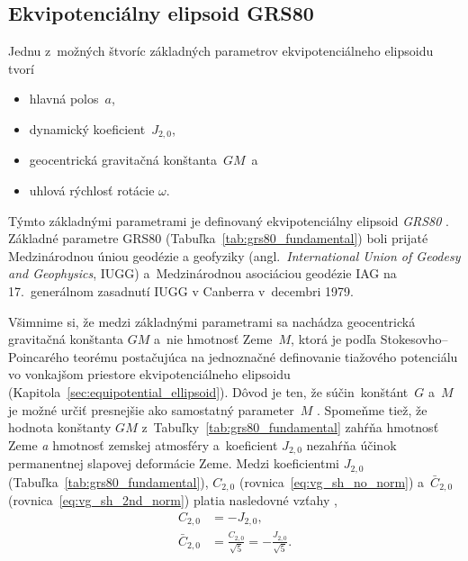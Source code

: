 \documentclass[a4paper, 12pt]{book}
\begin{document}
\subsection{Ekvipotenciálny elipsoid GRS80}
\label{sec:grs80}

Jednu z~možných štvoríc základných parametrov ekvipotenciálneho elipsoidu tvorí
%
\begin{itemize}
\item hlavná polos~$a$,
%
\item dynamický koeficient~$J_{2,0}$,
%
\item geocentrická gravitačná konštanta~$GM$~a
%
\item uhlová rýchlosť rotácie $\omega$.
\end{itemize}
%
Týmto základnými parametrami je definovaný ekvipotenciálny elipsoid 
\emph{GRS80} \parencite[angl. \textit{Geodetic Reference 
System~1980};][]{GRS80}.  Základné parametre GRS80 
(Tabuľka~\ref{tab:grs80_fundamental}) boli prijaté Medzinárodnou úniou geodézie 
a geofyziky (angl.~\textit{International Union of Geodesy and Geophysics}, 
IUGG) a~Medzinárodnou asociáciou geodézie IAG na 17.~generálnom zasadnutí IUGG 
v Canberra v~decembri 1979.

Všimnime si, že medzi základnými parametrami sa nachádza geocentrická 
gravitačná konštanta $GM$ a~nie hmotnosť Zeme~$M$, ktorá je podľa 
Stokesovho--Poincarého teorému postačujúca na jednoznačné definovanie tiažového 
potenciálu vo vonkajšom priestore ekvipotenciálneho elipsoidu 
(Kapitola~\ref{sec:equipotential_ellipsoid}).  Dôvod je ten, že 
súčin~konštánt~$G$ a~$M$ je možné určiť presnejšie ako samostatný parameter~$M$ 
\parencite[pozri napríklad][]{Pick2000}.  Spomeňme tiež, že hodnota konštanty 
$GM$ z~Tabuľky~\ref{tab:grs80_fundamental} zahŕňa hmotnosť Zeme \emph{a} 
hmotnosť zemskej atmosféry a~koeficient $J_{2,0}$ nezahŕňa účinok permanentnej 
slapovej deformácie Zeme.  Medzi koeficientmi $J_{2,0}$ 
(Tabuľka~\ref{tab:grs80_fundamental}), $C_{2,0}$ 
(rovnica~\ref{eq:vg_sh_no_norm}) a~$\bar{C}_{2,0}$ 
(rovnica~\ref{eq:vg_sh_2nd_norm}) platia nasledovné vzťahy 
\parencite{Moritz1967,MoritzPhysicalGeodesy},
%
\begin{align}
\label{eq:c20_j20}
C_{2,0} &= -J_{2,0}{,}\\
%
\label{eq:c20_j20_2}
\bar{C}_{2,0} &= \frac{C_{2,0}}{\sqrt{5}} = -\frac{J_{2,0}}{\sqrt{5}}{.}
\end{align}
\end{document}
